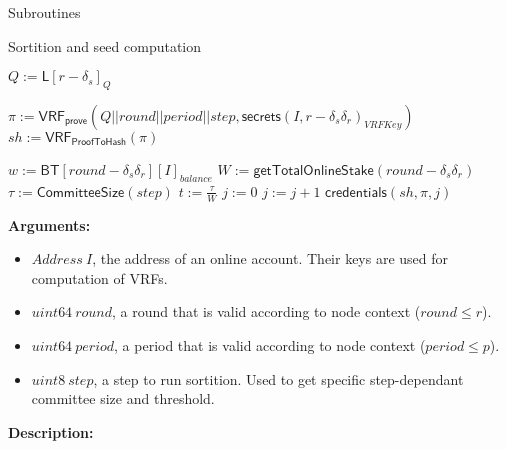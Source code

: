 \documentclass[10pt,a4paper]{article}
\begin{document}
\begin{section}{Subroutines}
\begin{subsection}{Sortition and seed computation}
\begin{algorithm}[H]
    \caption{Sortition}
    \label{algo:sortition}
    \begin{algorithmic}[1]
        \State $Q := \mathsf{L}[r - \delta_s]_{Q}$

        \State $\pi := \mathsf{VRF_{prove}}(Q||round||period||step, \mathsf{secrets}(I, r-\delta_s\delta_r)_{VRFKey})$
        \State $sh := \mathsf{VRF_{ProofToHash}}(\pi)$

        \State $w := \mathsf{BT}[round-\delta_s\delta_r][I]_{balance}$
        \State $W := \mathsf{getTotalOnlineStake}(round-\delta_s\delta_r)$
        \State $\tau := \mathsf{CommitteeSize}(step)$
        \State $t := \frac{\tau}{W}$
        \State $j := 0$
        \While{$\frac{sh}{2^{\mathsf{log_2}(sh)}}\notin [ \sum_{k=0}^j\mathsf{B}(k;w,t), \sum_{k=0}^{j+1}\mathsf{B}(k;w,t))$}
            \State $j := j+1$
        \EndWhile
        \State \Return $\mathsf{credentials}(sh, \pi, j)$
    \EndFunction
    \end{algorithmic}
    \caption{\underline{Sortition}}
\end{algorithm}


\noindent \textbf{Arguments:}
\begin{itemize}
    \item $Address \ I$, the address of an online account. Their keys are used for computation of VRFs.
    \item $uint64 \ round$, a round that is valid according to node context ($round \leq r$).
    \item $uint64 \ period$, a period that is valid according to node context ($period \leq p$).
    \item $uint8 \ step$, a step to run sortition. Used to get specific step-dependant committee size and threshold.
\end{itemize}

\noindent \textbf{Description:}


\end{subsection}
\end{section}
\end{document}
